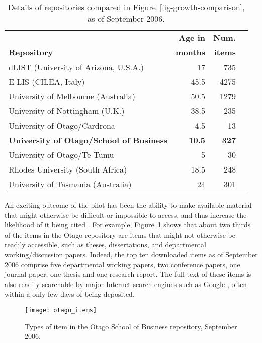 \documentclass[12pt,pdftex,a4paper,titlepage]{article}
\begin{document}
\begin{table}
	\caption{Details of repositories compared in Figure~\ref{fig-growth-comparison}, as of September 2006.}
	\label{tab-repositories}
	\begin{center}
		\begin{tabular}{lrrl}
															&	\textbf{Age in}	&	\textbf{Num.}	\\
			\textbf{Repository}								&	\textbf{months}	&	\textbf{items}	\\
			\hline
			dLIST (University of Arizona, U.S.A.)			&	17				&	735	\\
			E-LIS (CILEA, Italy)							&	45.5			&	4275	\\
			University of Melbourne (Australia)				&	50.5			&	1279	\\
			University of Nottingham (U.K.)					&	38.5			&	235	\\
			University of Otago/Cardrona					&	4.5				&	13	\\
			\textbf{University of Otago/School of Business}	&	\textbf{10.5}	&	\textbf{327}	\\
			University of Otago/Te Tumu						&	5				&	30	\\
			Rhodes University (South Africa)				&	18.5			&	248	\\
			University of Tasmania (Australia)				&	24				&	301	\\
		\end{tabular}
	\end{center}
\end{table}


An exciting outcome of the pilot has been the ability to make available material that might otherwise be difficult or impossible to access, and thus increase the likelihood of it being cited \cite{Harn-S-2005-research,Hajj-C-2005-citation}. For example, Figure~\ref{fig-item-types} shows that about two thirds of the items in the Otago repository are items that might not otherwise be readily accessible, such as theses, dissertations, and departmental working/discussion papers. Indeed, the top ten downloaded items as of September 2006 comprise five departmental working papers, two conference papers, one journal paper, one thesis and one research report. The full text of these items is also readily searchable by major Internet search engines such as Google \cite{Sale-A-2006-OAchapter}, often within a only few days of being deposited.


\begin{figure}
	\centering
	\texttt{[image: otago\_items]}
	\caption{Types of item in the Otago School of Business repository, September 2006.}
	\label{fig-item-types}
\end{figure}
\end{document}
